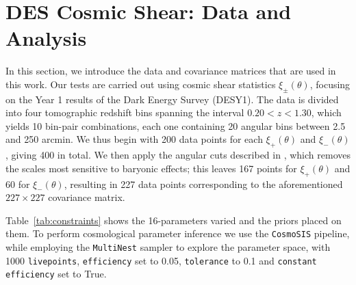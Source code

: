 \documentclass[twocolumn]{\docclass}
\begin{document}
	\section{DES Cosmic Shear: Data and Analysis}
	\label{sec:methods}
	
	In this section, we introduce the data and covariance matrices that are used in this work. Our tests are carried out using cosmic shear statistics $\xi_\pm(\theta)$, focusing on the Year 1 results of the Dark Energy Survey \citep{Troxel:2017xyo,Abbott:2018cms} (DESY1). The data is divided into four tomographic redshift bins spanning the interval $0.20 < z < 1.30$, which yields 10 bin-pair combinations, each one containing 20 angular bins between 2.5 and 250 arcmin. We thus begin with 200 data points for each $\xi_+(\theta)$ and $\xi_-(\theta)$, giving 400 in total. We then apply the angular cuts described in \citep{Abbott:2018cms}, which removes the scales most sensitive to baryonic effects; this leaves 167 points for $\xi_+(\theta)$ and 60 for $\xi_-(\theta)$, resulting in 227 data points corresponding to the aforementioned $227 \times 227$ covariance matrix. 
	
	Table~\ref{tab:constraints} shows the 16-parameters varied and the priors placed on them. To perform cosmological parameter inference we use the {\tt CosmoSIS} \citep{Zuntz:2015med, Lewis2000taj, Kirk2012mnras, Kilbinger2009aa, Howlett2012jcap, Bridle2007njp, Takahashi2012taj, Smith2003mnras} pipeline, while employing the {\tt MultiNest} \citep{Feroz:2009fhb} sampler to explore the parameter space, with 1000 {\tt livepoints}, {\tt efficiency} set to 0.05, {\tt tolerance} to 0.1 and {\tt constant efficiency} set to True.
	
\end{document}

